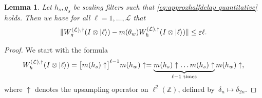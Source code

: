 \documentclass[aps,pra,reprint,superscriptaddress,floatfix,amsmath,amssymb,amsfonts]{revtex4-1}
\newtheorem{lem}{Lemma}\crefname{lem}{Lemma}{Lemmas}
\newcommand*{\Z}{\mathbb Z}
\newcommand*{\ot}{\otimes}
\begin{document}
\begin{lem}\label{lem:phase error}
Let $h_s, g_s$ be scaling filters such that \cref{eq:approxhalfdelay quantitative} holds.
Then we have for all $\ell=1,\dots,\mathcal L$ that
\[ \lVert W_g^{(\mathcal L),\dagger} (I \ot \ket \ell) - m(\theta_w) W_h^{(\mathcal L),\dagger} (I \ot \ket \ell) \rVert \leq \varepsilon \ell. \]
\end{lem}
\begin{proof}
  We start with the formula
  \begin{equation}\label{eq:inverse wavelet}
    W_h^{(\mathcal L),\dagger} (I \ot \ket \ell) = \bigl[ m(h_s) \uparrow \bigr]^{\ell-1} m(h_w) \uparrow = \underbrace{m(h_s) \uparrow \ldots m(h_s) \uparrow}_{\ell-1 \text{ times}} m(h_w) \uparrow,
  \end{equation}
  where $\uparrow$ denotes the upsampling operator on $\ell^2(\Z)$, defined by~$\delta_n \mapsto \delta_{2n}$.


\end{proof}
\end{document}
